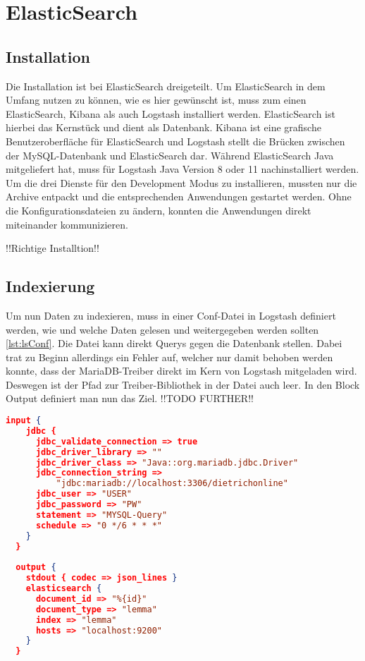
\section{ElasticSearch}

\subsection{Installation}

Die Installation ist bei ElasticSearch dreigeteilt. Um ElasticSearch in dem Umfang nutzen zu können, wie es hier gewünscht ist, muss zum einen ElasticSearch, Kibana als auch Logstash installiert werden. ElasticSearch ist hierbei das Kernstück und dient als Datenbank. Kibana ist eine grafische Benutzeroberfläche für ElasticSearch und Logstash stellt die Brücken zwischen der MySQL-Datenbank und ElasticSearch dar. Während ElasticSearch Java mitgeliefert hat, muss für Logstash Java Version 8 oder 11 nachinstalliert werden. Um die drei Dienste für den Development Modus zu installieren, mussten nur die Archive entpackt und die entsprechenden Anwendungen gestartet werden. Ohne die Konfigurationsdateien zu ändern, konnten die Anwendungen direkt miteinander kommunizieren. 

!!Richtige Installtion!!

\subsection{Indexierung}

Um nun Daten zu indexieren, muss in einer Conf-Datei in Logstash definiert werden, wie und welche Daten gelesen und weitergegeben werden sollten \ref{lst:lsConf}. Die Datei kann direkt Querys gegen die Datenbank stellen. Dabei trat zu Beginn allerdings ein Fehler auf, welcher nur damit behoben werden konnte, dass der MariaDB-Treiber direkt im Kern von Logstash mitgeladen wird. Deswegen ist der Pfad zur Treiber-Bibliothek in der Datei auch leer. In den Block Output definiert man nun das Ziel. !!TODO FURTHER!!


\begin{lstlisting}[language=json, frame=single, label={lst:lsConf}] 
  input {
    jdbc {
      jdbc_validate_connection => true
      jdbc_driver_library => ""
      jdbc_driver_class => "Java::org.mariadb.jdbc.Driver"
      jdbc_connection_string =>
          "jdbc:mariadb://localhost:3306/dietrichonline"
      jdbc_user => "USER"
      jdbc_password => "PW"
      statement => "MYSQL-Query"
      schedule => "0 */6 * * *"
    }
  }
  
  output {
    stdout { codec => json_lines }
    elasticsearch {
      document_id => "%{id}"
      document_type => "lemma"
      index => "lemma"
      hosts => "localhost:9200"
    }
  }
\end{lstlisting}


